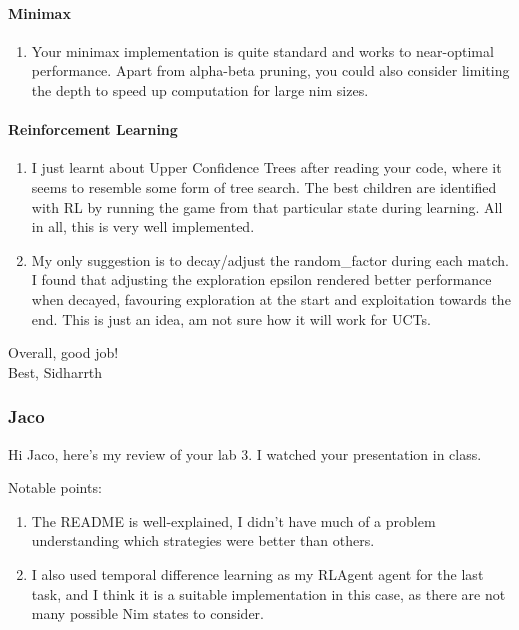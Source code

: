 \paragraph{Minimax}

\begin{enumerate}
    \item Your minimax implementation is quite standard and works to near-optimal performance. Apart from alpha-beta pruning, you could also consider limiting the depth to speed up computation for large nim sizes.
\end{enumerate}

\paragraph{Reinforcement Learning}

\begin{enumerate}
    \item I just learnt about Upper Confidence Trees after reading your code, where it seems to resemble some form of tree search. The best children are identified with RL by running the game from that particular state during learning. All in all, this is very well implemented.
    \item My only suggestion is to decay/adjust the random\_factor during each match. I found that adjusting the exploration epsilon rendered better performance when decayed, favouring exploration at the start and exploitation towards the end. This is just an idea, am not sure how it will work for UCTs.
\end{enumerate}

Overall, good job! \\

Best,
Sidharrth

\subsubsection{Jaco}

Hi Jaco, here's my review of your lab 3. I watched your presentation in class.

Notable points:
\begin{enumerate}
    \item The README is well-explained, I didn't have much of a problem understanding which strategies were better than others.
    \item I also used temporal difference learning as my RLAgent agent for the last task, and I think it is a suitable implementation in this case, as there are not many possible Nim states to consider.
\end{enumerate}

